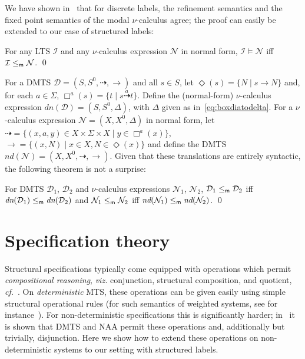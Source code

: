 \documentclass[twocolumn]{svjour3-dummy}
\newcommand*\cf{\textit{cf.}\xspace}
\newcommand*\cI{\mathcal I}
\newcommand*{\must}[1]{\overset{#1}{\longrightarrow}}
\newcommand*{\omust}{\mathord{\must{}}}
\newcommand*\cD{\mathcal D}
\newcommand*{\may}[1]{\overset{#1}{\dashrightarrow}}
\newcommand*{\omay}{\mathord{\may{}}}
\newcommand*\NAA{NAA\xspace}
\newcommand*\mr{\le_\textup{\textsf{m}}}
\newcommand*\noproof{\qed}
\newcommand*\cN{\mathcal N}
\newcommand*\ddh{\textit{dn}} \newcommand*\hd{\textit{nd}} \newcommand*\viz{\textit{viz.}\xspace}
\begin{document}
We have shown in~\cite[Thm.~15]{DBLP:conf/ictac/FahrenbergLT14} that
for discrete labels, the refinement semantics and the fixed point
semantics of the modal $\nu$-calculus agree; the proof can easily be
extended to our case of structured labels:

\begin{theorem}
  For any LTS $\cI$ and any $\nu$-calculus expression $\cN$ in normal
  form, $\cI\models \cN$ iff $\cI\mr \cN$.  \noproof
\end{theorem}

For a DMTS $\cD=( S, S^0, \omay, \omust)$ and all $s\in S$, let
$\Diamond(s)=\{ N \mid s \must{} N\}$ and, for each $a\in \Sigma$,
$\Box^a(s)=\{ t \mid s \may{a} t\}$.  Define the (normal-form)
$\nu$-calculus expression $\ddh( \cD)=( S, S^0, \Delta)$, with $\Delta$
given as in~\eqref{eq:boxdiatodelta}.
For a $\nu$-calculus expression $\cN=( X, X^0, \Delta)$ in normal form,
let $\omay=\{( x, a, y)\in X\times \Sigma\times X\mid y\in \Box^a(
x)\}$, $\omust=\{( x, N)\mid x\in X, N\in \Diamond( x)\}$ and define the
DMTS $\hd( \cN)=( X, X^0, \omay, \omust)$.  Given that these
translations are entirely syntactic, the following theorem is not a
surprise:

\begin{theorem}
  \label{th:dmtsvsnu-bool}
  For DMTS $\cD_1$, $\cD_2$ and $\nu$-calculus expressions $\cN_1$,
  $\cN_2$, $\cD_1\mr \cD_2$ iff $\ddh( \cD_1)\mr \ddh( \cD_2)$ and
  $\cN_1\mr \cN_2$ iff $\hd( \cN_1)\mr \hd( \cN_2)$.  \noproof
\end{theorem}

\section{Specification theory}
\label{se:specth}

Structural specifications typically come equipped with operations
which permit \emph{compositional reasoning}, \viz conjunction,
structural composition, and quotient,
\cf~\cite{DBLP:conf/fase/BauerDHLLNW12}.  On \emph{deterministic} MTS,
these operations can be given easily using simple structural
operational rules (for such semantics of weighted systems, see for
instance~\cite{DBLP:journals/iandc/KlinS13}).  For non-deterministic
specifications this is significantly harder;
in~\cite{DBLP:conf/concur/BenesDFKL13} it is shown that DMTS and \NAA
permit these operations and, additionally but trivially, disjunction.
Here we show how to extend these operations on non-deterministic
systems to our setting with structured labels.
\end{document}
